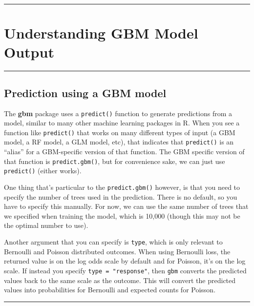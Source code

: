 \documentclass[
]{book}
\begin{document}
\begin{center}\rule{0.5\linewidth}{0.5pt}\end{center}

\hypertarget{understanding-gbm-model-output}{%
\section{Understanding GBM Model Output}\label{understanding-gbm-model-output}}

\begin{center}\rule{0.5\linewidth}{0.5pt}\end{center}

\hypertarget{prediction-using-a-gbm-model}{%
\subsection{Prediction using a GBM model}\label{prediction-using-a-gbm-model}}

The \textbf{gbm} package uses a \texttt{predict()} function to generate predictions from a model, similar to many other machine learning packages in R. When you see a function like \texttt{predict()} that works on many different types of input (a GBM model, a RF model, a GLM model, etc), that indicates that \texttt{predict()} is an ``alias'' for a GBM-specific version of that function. The GBM specific version of that function is \texttt{predict.gbm()}, but for convenience sake, we can just use \texttt{predict()} (either works).

One thing that's particular to the \texttt{predict.gbm()} however, is that you need to specify the number of trees used in the prediction. There is no default, so you have to specify this manually. For now, we can use the same number of trees that we specified when training the model, which is 10,000 (though this may not be the optimal number to use).

Another argument that you can specify is \texttt{type}, which is only relevant to Bernoulli and Poisson distributed outcomes. When using Bernoulli loss, the returned value is on the log odds scale by default and for Poisson, it's on the log scale. If instead you specify \texttt{type\ =\ "response"}, then \texttt{gbm} converts the predicted values back to the same scale as the outcome. This will convert the predicted values into probabilities for Bernoulli and expected counts for Poisson.

\begin{center}\rule{0.5\linewidth}{0.5pt}\end{center}
\end{document}
